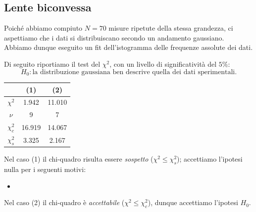 \documentclass[a4paper]{article}
\begin{document}
    \subsection{Lente biconvessa}
    Poiché abbiamo compiuto $N=70$ misure ripetute della stessa grandezza, ci aspettiamo che i dati si distribuiscano secondo un andamento gaussiano. Abbiamo dunque eseguito un fit dell'istogramma delle frequenze assolute dei dati.
    \begin{figure}[H]%
    	\centering
    	\qquad
    \end{figure}
    Di seguito riportiamo il test del $\chi^2$, con un livello di significatività del $5\%$:
    \[
    H_0: \text{la distribuzione gaussiana ben descrive quella dei dati sperimentali.}
    \]
    \begin{table}[H]
    	\centering
    	\begin{tabular}{|c|c|c|}
    		\hline
    		 & (1) & (2) \\ \hline
    		$\chi^2$ & 1.942 & 11.010 \\
    		$\nu$ & 9 & 7 \\
    		$\chi^2_c$ & 16.919 & 14.067 \\
    		$\chi^2_s$ & 3.325 & 2.167 \\ \hline
    	\end{tabular}
    	\label{tab:chi-quadro-biconvessa}
    \end{table}
    Nel caso (1) il chi-quadro risulta essere \textit{sospetto} ($\chi^2\leq\chi^2_s$); accettiamo l'ipotesi nulla per i seguenti motivi:
    \begin{itemize}
    	\item %
    \end{itemize}Nel caso (2) il chi-quadro è \textit{accettabile} ($\chi^2\leq\chi^2_c$), dunque accettiamo l'ipotesi $H_0$.
    
\end{document}
